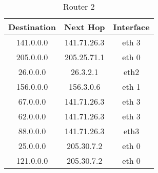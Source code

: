 \documentclass{scrartcl}
\begin{document}
\begin{table}[h]
\centering
\caption{Router 2}
\label{Router 2}
\begin{tabular}{ccc}
\hline
\multicolumn{1}{|c|}{\textbf{Destination}} & \multicolumn{1}{c|}{\textbf{Next Hop}} & \multicolumn{1}{c|}{\textbf{Interface}} \\ \hline
141.0.0.0                                  & 141.71.26.3                            & eth 3                                   \\
205.0.0.0                                  & 205.25.71.1                            & eth 0                                   \\
26.0.0.0                                   & 26.3.2.1                               & eth2                                    \\
156.0.0.0                                  & 156.3.0.6                              & eth 1                                   \\
67.0.0.0                                   & 141.71.26.3                            & eth 3                                   \\
62.0.0.0                                   & 141.71.26.3                            & eth 3                                   \\
88.0.0.0                                   & 141.71.26.3                            & eth3                                    \\
25.0.0.0                                   & 205.30.7.2                             & eth 0                                   \\
121.0.0.0                                  & 205.30.7.2                             & eth 0                                  
\end{tabular}
\end{table}
\end{document}
